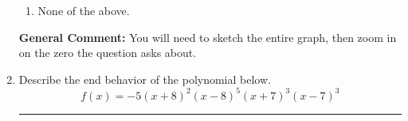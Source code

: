 \documentclass{extbook}[14pt]
\newcommand{\litem}[1]{\item #1

\rule{\textwidth}{0.4pt}}
\begin{document}
\begin{enumerate}
{\begin{enumerate}[label=\Alph*.]
\item None of the above.\end{enumerate}
\textbf{General Comment:} You will need to sketch the entire graph, then zoom in on the zero the question asks about.
}
\litem{
Describe the end behavior of the polynomial below.
\[ f(x) = -5(x + 8)^{2}(x - 8)^{5}(x + 7)^{3}(x - 7)^{3} \]

}
\end{enumerate}
\end{document}
